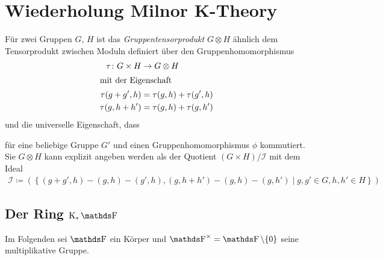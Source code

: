 \documentclass[ngerman,fontsize=11pt, paper=a4, parskip=half, titlepage=true, toc=bib]{scrartcl}
\begin{document}
\maketitle
\tableofcontents




\section{Wiederholung Milnor K-Theory}

\begin{Bem}[Gruppentensorprodukt]
  Für zwei Gruppen $G$, $H$ ist das 
  \emph{Gruppentensorprodukt} $G\otimes H$ 
  ähnlich dem Tensorprodukt zwischen Moduln definiert
  über den Gruppenhomomorphismus
  \begin{align*}
    \tau\colon G\times H&\rightarrow G\otimes H\\
    \intertext{mit der Eigenschaft}
    \tau(g+g',h) &= \tau(g,h)+\tau(g',h)\\
    \tau(g,h+h') &= \tau(g,h)+\tau(g,h')
  \end{align*}
und die universelle Eigenschaft, dass
\begin{center}
\end{center}
für eine beliebige Gruppe $G'$ und einen Gruppenhomomorphismus $\phi$
kommutiert.
Sie $G\otimes H$ kann explizit angeben werden als der Quotient
$(G\times H) / \mathcal{I}$ mit dem Ideal 
\begin{align*}
  \mathcal{I}\coloneqq \left(
    \left\{(g+g',h)-(g,h)-(g',h), (g,h+h')-(g,h)-(g,h')
    \mid g,g'\in G, h,h'\in H \right\}
  \right)
\end{align*}
\end{Bem}

\subsection{Der Ring $\KF$}
Im Folgenden sei $\F$ ein Körper und $\Fx=\F\setminus \{0\}$ seine
multiplikative Gruppe.
\end{document}
